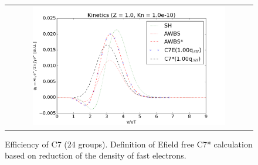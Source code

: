 \documentclass[preprint,12pt]{elsarticle}
\begin{document}
\begin{figure}[tbh]
  \begin{center}
    \begin{tabular}{c}
      \includegraphics[width=0.8\textwidth]{../results/fe_analysis/figs/efficient_P8_kinetics_Z1_Kn1e-10.png} 
    \end{tabular}
  \caption{
  Efficiency of C7 (24 groups). Definition of Efield free C7* calculation 
  based on reduction of the density of fast electrons.
  }
  \end{center}
  \label{fig:C7AWBScorrection}
\end{figure}
\end{document}
